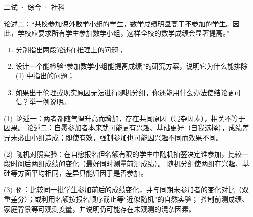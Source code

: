 \documentclass[cjk=noto, seal=first]{mojing-exam}
\begin{document}
\begin{paper}[time={建议 1.5 小时（训练设置）}, full=100]{二试 · 综合 · 社科}
\begin{questions}
\hspace{2em}论述二：“某校参加课外数学小组的学生，数学成绩明显高于不参加的学生。因此，学校应要求所有学生参加数学小组，这样全校的数学成绩会显著提高。”
\begin{enumerate}
  \item 分别指出两段论述在推理上的问题；
  \item 设计一个能检验“参加数学小组能提高成绩”的研究方案，说明它为什么能排除 (1) 中指出的问题；
  \item 如果出于伦理或现实原因无法进行随机分组，你还能用什么办法使结论更可信？举一例说明。
\end{enumerate}
\answerspace{2cm}
\begin{solution}
(1)~论述一：两者都随气温升高而增加，存在共同原因（混杂因素），相关不等于因果。
论述二：自愿参加者本来就可能更有兴趣、基础更好（自我选择），成绩差异未必由小组造成；即使有效，强制参加也可能因兴趣不同而效果不同。

(2)~随机对照实验：在自愿报名但名额有限的学生中随机抽签决定谁参加，比较一段时间后两组成绩的变化（最好同时测量前测成绩）。
随机分组使两组在兴趣、基础等方面平均相同，差异只能归因于是否参加。

(3)~例：比较同一批学生参加前后的成绩变化，并与同期未参加者的变化对比（双重差分）；或利用名额按报名顺序截止等“近似随机”的自然实验；
控制前测成绩、家庭背景等可观测变量，并说明仍可能存在未观测的混杂因素。
\end{solution}

\end{questions}
\end{paper}
\end{document}
